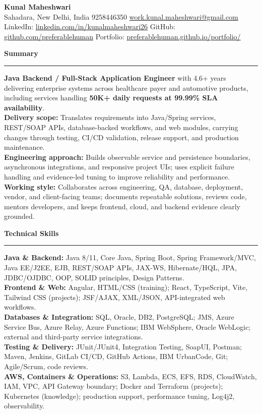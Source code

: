 \documentclass[11pt,letterpaper]{article}
\newcommand{\ressection}[1]{\Needspace{6\baselineskip}\vspace{8pt}\par\textbf{#1}\par\vspace{2pt}\hrule\vspace{5pt}}
\begin{document}
\pagestyle{empty}\raggedright\fontsize{11}{12.5}\selectfont

{\Large \textbf{Kunal Maheshwari}}\\
Sahadara, New Delhi, India \textbar{} 9258446350 \textbar{} \href{mailto:work.kunal.maheshwari@gmail.com}{work.kunal.maheshwari@gmail.com}\\
LinkedIn: \href{https://www.linkedin.com/in/kunalmaheshwari26}{linkedin.com/in/kunalmaheshwari26} \textbar{} GitHub: \href{https://github.com/preferablehuman}{github.com/preferablehuman} \textbar{} Portfolio: \href{https://preferablehuman.github.io/portfolio/}{preferablehuman.github.io/portfolio/}

\ressection{Summary}
\textbf{Java Backend / Full-Stack Application Engineer} with 4.6+ years delivering enterprise systems across healthcare payer and automotive products, including services handling \textbf{50K+ daily requests at 99.99\% SLA availability}.\\[2pt]
\textbf{Delivery scope:} Translates requirements into Java/Spring services, REST/SOAP APIs, database-backed workflows, and web modules, carrying changes through testing, CI/CD validation, release support, and production maintenance.\\[2pt]
\textbf{Engineering approach:} Builds observable service and persistence boundaries, asynchronous integrations, and responsive project UIs; uses explicit failure handling and evidence-led tuning to improve reliability and performance.\\[2pt]
\textbf{Working style:} Collaborates across engineering, QA, database, deployment, vendor, and client-facing teams; documents repeatable solutions, reviews code, mentors developers, and keeps frontend, cloud, and backend evidence clearly grounded.

\ressection{Technical Skills}
\textbf{Java \& Backend:} Java 8/11, Core Java, Spring Boot, Spring Framework/MVC, Java EE/J2EE, EJB, REST/SOAP APIs, JAX-WS, Hibernate/HQL, JPA, JDBC/OJDBC, OOP, SOLID principles, Design Patterns.\\
\textbf{Frontend \& Web:} Angular, HTML/CSS (training); React, TypeScript, Vite, Tailwind CSS (projects); JSF/AJAX, XML/JSON, API-integrated web workflows.\\
\textbf{Databases \& Integration:} SQL, Oracle, DB2, PostgreSQL; JMS, Azure Service Bus, Azure Relay, Azure Functions; IBM WebSphere, Oracle WebLogic; external and third-party service integrations.\\
\textbf{Testing \& Delivery:} JUnit/JUnit4, Integration Testing, SoapUI, Postman; Maven, Jenkins, GitLab CI/CD, GitHub Actions, IBM UrbanCode, Git; Agile/Scrum, code reviews.\\
\textbf{AWS, Containers \& Operations:} S3, Lambda, ECS, EFS, RDS, CloudWatch, IAM, VPC, API Gateway boundary; Docker and Terraform (projects); Kubernetes (knowledge); production support, performance tuning, Log4j2, observability.
\end{document}
